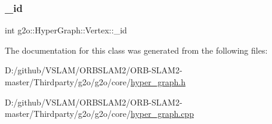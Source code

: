 \subsubsection{\texorpdfstring{\+\_\+id}{\_id}}
{\footnotesize\ttfamily int g2o\+::\+Hyper\+Graph\+::\+Vertex\+::\+\_\+id\hspace{0.3cm}{\ttfamily [protected]}}



The documentation for this class was generated from the following files\+:\begin{DoxyCompactItemize}
\item 
D\+:/github/\+V\+S\+L\+A\+M/\+O\+R\+B\+S\+L\+A\+M2/\+O\+R\+B-\/\+S\+L\+A\+M2-\/master/\+Thirdparty/g2o/g2o/core/\mbox{\hyperlink{hyper__graph_8h}{hyper\+\_\+graph.\+h}}\item 
D\+:/github/\+V\+S\+L\+A\+M/\+O\+R\+B\+S\+L\+A\+M2/\+O\+R\+B-\/\+S\+L\+A\+M2-\/master/\+Thirdparty/g2o/g2o/core/\mbox{\hyperlink{hyper__graph_8cpp}{hyper\+\_\+graph.\+cpp}}\end{DoxyCompactItemize}
